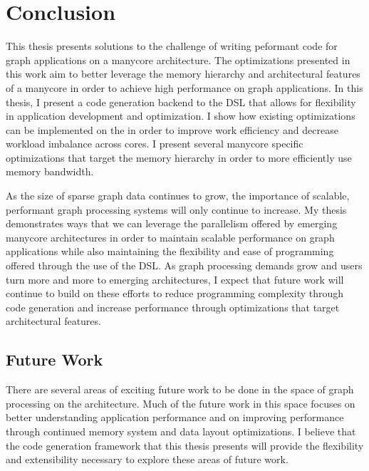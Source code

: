 \chapter{Conclusion}\label{gen:sec:conclusion}

This thesis presents solutions to the challenge of writing peformant code for graph applications on a manycore architecture. 
The optimizations presented in this work aim to better leverage the memory hierarchy and architectural features of a manycore in order to achieve high performance on graph applications. 
In this thesis, I present a code generation backend to the \graphit DSL that allows for flexibility in application development and optimization. 
I show how existing optimizations can be implemented on the \hbmc in order to improve work efficiency and decrease workload imbalance across cores. 
I present several manycore specific optimizations that target the memory hierarchy in order to more efficiently use memory bandwidth.

As the size of sparse graph data continues to grow, the importance of scalable, performant graph processing systems will only continue to increase. 
My thesis demonstrates ways that we can leverage the parallelism offered by emerging manycore architectures in order to maintain scalable performance on graph applications while also maintaining the flexibility and ease of programming offered through the use of the \graphit DSL. 
As graph processing demands grow and users turn more and more to emerging architectures, I expect that future work will continue to build on these efforts to reduce programming complexity through code generation and increase performance through optimizations that target architectural features. 

\section{Future Work}
There are several areas of exciting future work to be done in the space of graph processing on the \hbmc architecture. 
Much of the future work in this space focuses on better understanding application performance and on improving performance through continued memory system and data layout optimizations.
I believe that the code generation framework that this thesis presents will provide the flexibility and extensibility necessary to explore these areas of future work.

